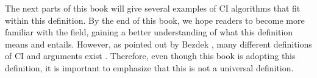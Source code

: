 The next parts of this book will give several examples of CI algorithms that fit within this definition. By the end of this book, we hope readers to become more familiar with the field, gaining a better understanding of what this definition means and entails. However, as  pointed out by Bezdek \cite{Bezdek}, many different definitions of CI and arguments exist \cite{CIDef1,CIDef2,CIDef3,CIDef4,CIDef5,CIDef6,CIDef7,ciswebsite}. Therefore, even though this book is adopting this definition, it is important to emphasize that this is not a universal definition.




